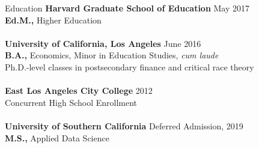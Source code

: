 \documentclass{resume} %
\begin{document}
\begin{rSection}{Education}
{\bf Harvard Graduate School of Education} \hfill May 2017
\\ {\bf Ed.M.,} Higher Education
\\
\\
{\bf University of California, Los Angeles} \hfill June 2016
\\ {\bf B.A.,} Economics, Minor in Education Studies, {\em cum laude}
\\ Ph.D.-level classes in postsecondary finance and critical race theory
\\ 
\\
{\bf East Los Angeles City College} \hfill 2012
\\ Concurrent High School Enrollment
\\
\\
{\bf University of Southern California} \hfill Deferred Admission, 2019
\\ {\bf M.S.,} Applied Data Science
    \end{rSection}
\end{document}
